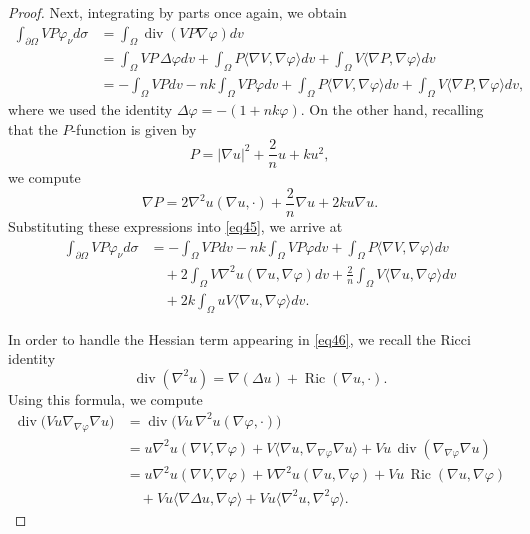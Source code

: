 \documentclass[reqno,11pt]{amsart}
\numberwithin{equation}{section}  %
\begin{document}
\begin{proof}
Next, integrating by parts once again, we obtain
\begin{align}\label{eq45}
\int_{\partial\Omega}VP\varphi_{\nu}d\sigma
&=
\int_{\Omega}\operatorname{div}(VP\nabla\varphi)dv
\nonumber\\
&=
\int_{\Omega}VP\,\Delta\varphi dv
+
\int_{\Omega}P\langle\nabla V,\nabla\varphi\rangle dv
+
\int_{\Omega}V\langle\nabla P,\nabla\varphi\rangle dv
\nonumber\\
&=
-\int_{\Omega}VPdv
-nk\int_{\Omega}VP\varphi dv
+
\int_{\Omega}P\langle\nabla V,\nabla\varphi\rangle dv
+
\int_{\Omega}V\langle\nabla P,\nabla\varphi\rangle dv,
\end{align}
where we used the identity \(\Delta\varphi=-(1+nk\varphi)\). On the other hand, recalling that the \(P\)-function is given by
\begin{equation}\label{P_func1}
P=|\nabla u|^{2}+\frac{2}{n}u+ku^{2},    
\end{equation}
we compute
\begin{equation}\label{P_funct2}
\nabla P
=
2\nabla^{2}u(\nabla u,\cdot)
+\frac{2}{n}\nabla u
+2ku\nabla u.    
\end{equation}
Substituting these expressions into \eqref{eq45}, we arrive at
\begin{align}\label{eq46}
\int_{\partial\Omega}VP\varphi_{\nu} d\sigma
&=
-\int_{\Omega}VP dv
-nk\int_{\Omega}VP\varphi dv
+
\int_{\Omega}P\langle\nabla V,\nabla\varphi\rangle dv
\nonumber\\
&\quad
+
2\int_{\Omega}V\nabla^{2}u(\nabla u,\nabla\varphi)dv
+
\frac{2}{n}\int_{\Omega}V\langle\nabla u,\nabla\varphi\rangle dv
\nonumber\\
&\quad
+
2k\int_{\Omega}uV\langle\nabla u,\nabla\varphi\rangle dv.
\end{align}

In order to handle the Hessian term appearing in \eqref{eq46}, we recall the Ricci identity
\begin{equation}\label{Ricci_id}
\operatorname{div}(\nabla^2u)
=
\nabla(\Delta u)+\operatorname{Ric}(\nabla u,\cdot).    
\end{equation}
Using this formula, we compute
\begin{align}\label{eq_auxiliar}
\operatorname{div}\bigl(Vu\nabla_{\nabla\varphi}\nabla u\bigr)
&=
\operatorname{div}\bigl(Vu\,\nabla^{2}u(\nabla\varphi,\cdot)\bigr)
\nonumber\\
&=
u\nabla^{2}u(\nabla V,\nabla\varphi)
+
V\langle\nabla u,\nabla_{\nabla\varphi}\nabla u\rangle
+
Vu\,\operatorname{div}(\nabla_{\nabla\varphi}\nabla u)
\nonumber\\
&=
u\nabla^{2}u(\nabla V,\nabla\varphi)
+
V\nabla^{2}u(\nabla u,\nabla\varphi)
+
Vu\,\operatorname{Ric}(\nabla u,\nabla\varphi)
\nonumber\\
&\quad
+
Vu\langle\nabla\Delta u,\nabla\varphi\rangle
+
Vu\langle\nabla^{2}u,\nabla^{2}\varphi\rangle.
\end{align}


\end{proof}
\end{document}
